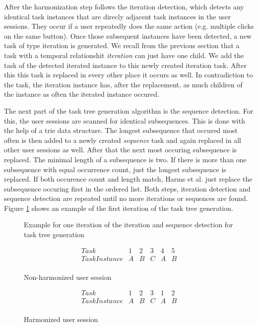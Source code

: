 After the harmonization step follows the iteration detection, which detects any identical task instances that are direcly adjacent task instances in the user sessions. They occur if a user repeatedly does the same action (e.g. multiple clicks on the same button). 
Once those subsequent instances have been detected, a new task of type iteration is generated. 
We recall from the previous section that a task with a temporal relationshit \textit{iteration} can just have one child. We add the task of the detected iterated instance to this newly created iteration task.
After this this task is replaced in every other place it occurs as well. In contradiction to the task, the iteration instance has, after the replacement, as much children of the instance as often the iterated instance occured.

The next part of the task tree generation algorithm is the sequence detection.
For this, the user sessions are scanned for identical subsequences. This is done with the help of a trie data structure.
The longest subsequence that occured most often is then added to a newly created \textit{sequence} task and again replaced in
all other user sessions as well. After that the next most occuring subsequence is replaced. The minimal length of a subsequence is two.
If there is more than one subsequence with equal occurrence count, just the longest subsequence is replaced.
If both occurence count and length match, Harms et al. just replace the subsequence occuring first in the ordered list.
Both steps, iteration detection and sequence detection are repeated until no more iterations or sequences are found.
Figure \ref{fig:exampletasktreeharms} shows an example of the first iteration of the task tree generation.

\begin{figure}
	\caption{Example for one iteration of the iteration and sequence detection for task tree generation}
	\label{fig:exampletasktreeharms}
\end{figure}

\begin{figure}
\[
\begin{array}{r|ccccc}
	Task & 1 & 2 & 3 & 4 & 5\\
	\hline
	TaskInstance & A & B & C & A & B\\
\end{array} 
\]
\caption{Non-harmonized user session}
\label{fig:nonharmonized}
\end{figure}

\begin{figure}
\[
\begin{array}{r|ccccc}
	Task & 1 & 2 & 3 & 1 & 2\\
	\hline
	TaskInstance & A & B & C & A & B\\
\end{array} 
\]
\caption{Harmonized user session}
\label{fig:harmonized}
\end{figure}

